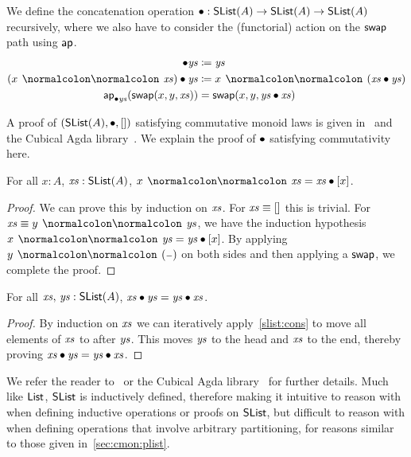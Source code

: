 \begin{toappendix}
    \begin{definition}[Concatenation]
        We define the concatenation operation $\mathbin{\bullet} : \operatorname{\mathsf{SList}}(A) \to \operatorname{\mathsf{SList}}(A) \to \operatorname{\mathsf{SList}}(A)$
        recursively, where we also have to consider the (functorial) action on the $\operatorname{\mathsf{swap}}$ path using $\operatorname{\mathsf{ap}}$.
        \begin{align*}
            [] \mult \ys                                  & \defeq \ys                         \\
            (x \cons \xs) \mult \ys                       & \defeq x \cons (\xs \mult \ys)     \\
            \term{ap}_{\mult \ys}(\term{swap}(x, y, \xs)) & = \term{swap}(x, y, \ys \mult \xs)
        \end{align*}
    \end{definition}
    A proof of $(\operatorname{\mathsf{SList}}(A), \mathbin{\bullet}, [])$ satisfying commutative monoid laws
    is given in~\cite{choudhuryFreeCommutativeMonoids2023} and the Cubical Agda library~\cite{theagdacommunityCubicalAgdaLibrary2025}.
    We explain the proof of $\mathbin{\bullet}$ satisfying commutativity here.

    \begin{lemma}\label{slist:cons}
        For all $x : A$, $\mathit{xs} : \operatorname{\mathsf{SList}}(A)$, $x \cons \xs = \xs \mult [ x ]$.
    \end{lemma}

    \begin{proof}
        We can prove this by induction on $\mathit{xs}$.
        For $\mathit{xs} \mathrel{\equiv} []$ this is trivial. For $\xs \jdgeq y \cons \ys$, we have the induction hypothesis $x \cons \ys = \ys \mult [ x ]$.
        By applying $y \cons (\blank)$ on both sides and then applying a $\operatorname{\mathsf{swap}}$, we complete the proof.
    \end{proof}

    \begin{theorem}[Commutativity]\label{slist:comm}
        For all $\mathit{xs},\,\mathit{ys} : \operatorname{\mathsf{SList}}(A)$, $\mathit{xs} \mathbin{\bullet} \mathit{ys} = \mathit{ys} \mathbin{\bullet} \mathit{xs}$.
    \end{theorem}

    \begin{proof}
        By induction on $\mathit{xs}$ we can iteratively apply~\cref{slist:cons} to move all elements of $\mathit{xs}$
        to after $\mathit{ys}$. This moves $\mathit{ys}$ to the head and $\mathit{xs}$ to the end, thereby proving
        $\mathit{xs} \mathbin{\bullet} \mathit{ys} = \mathit{ys} \mathbin{\bullet} \mathit{xs}$.
    \end{proof}
\end{toappendix}
%
We refer the reader to~\cite{choudhuryFreeCommutativeMonoids2023} or the Cubical Agda library~\cite{theagdacommunityCubicalAgdaLibrary2025}
for further details.
%
Much like $\operatorname{\mathsf{List}}$, $\operatorname{\mathsf{SList}}$ is inductively defined, therefore making it intuitive to reason
with when defining inductive operations or proofs on $\operatorname{\mathsf{SList}}$, but difficult to reason with
when defining operations that involve arbitrary partitioning, for reasons similar to those given
in~\cref{sec:cmon:plist}.

